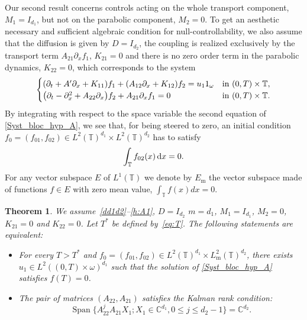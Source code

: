 \documentclass[10pt]{amsart}
\theoremstyle{plain}
\newtheorem{theorem}{Theorem}
\theoremstyle{definition}
\theoremstyle{remark}
\DeclareMathOperator{\Span}{Span}
\newcommand{\diff}[1][-3]{\ensuremath{\mathop{}\mkern#1mu\mathrm{d}}}
\newcommand{\set}{\mathbb}
\renewcommand{\C}{\set{C}}
\newcommand{\T}{\set{T}}
\newcommand{\m}{{\mathrm m}}
\let\originalleft\left
\let\originalright\right
\renewcommand{\left}{\mathopen{}\mathclose\bgroup\originalleft}
\renewcommand{\right}{\aftergroup\egroup\originalright}
\begin{document}
Our second result concerns controls acting on the whole transport component, $M_1=I_{d_1}$, but not on the parabolic component, $M_2=0$.
To get an aesthetic necessary and sufficient algebraic condition for null-controllability, we also assume that the diffusion is given by $D=I_{d_2}$, the coupling is realized exclusively by the transport term $A_{21}\partial_x f_1$, \ie $K_{21}=0$ and there is no zero order term in the parabolic dynamics, \ie $K_{22}=0$, which corresponds to the system
\begin{equation} \label{Syst_bloc_hyp_A}
\begin{cases}
\left(\partial_t +A'\partial_x+K_{11}\right)f_1+\left(A_{12}\partial_x+K_{12}\right)f_2= u_1 1_\omega
&\text{in}\ (0,T)\times \T,\!\\
\left(\partial_t - \partial_x^2+A_{22}\partial_x\right)f_2 + A_{21}\partial_x f_1 = 0 &\text{in}\ (0,T)\times \T.
\end{cases}
\end{equation}
By integrating with respect to the space variable the second equation of \eqref{Syst_bloc_hyp_A}, we see that, for being steered to zero, an initial condition $f_0=(f_{01},f_{02})\in L^2(\T)^{d_1} \times L^2(\T)^{d_2}$ has to satisfy
\begin{equation} \label{Hyp_A_contrainte}
\int_{\T} f_{02}(x) \diff x =0.
\end{equation}
For any vector subspace $E$ of $L^1(\T)$ we denote by $E_\m$ the vector subspace made of functions $f\in E$ with zero mean value, \ie $\int_{\T} f(x)dx =0$.

\begin{theorem}\label{th:main_2}
We assume~\eqref{dd1d2}--\eqref{h:A1}, $D=I_{d_2}$ $m=d_1$, $M_1=I_{d_1}$, $M_2=0$, $K_{21}=0$ and $K_{22}=0$. Let $T^\ast$ be defined by~\eqref{eq:T}.
The following statements are equivalent:
\begin{itemize}
\item For every $T>T^{\ast}$ and $f_0=(f_{01},f_{02})\in L^2(\T)^{d_1} \times L^2_\m(\T)^{d_2}$, there exists $u_1 \in L^2((0,T)\times\omega)^{d_1}$ such that the solution of \eqref{Syst_bloc_hyp_A} satisfies $f(T)=0$.
\item The pair of matrices $(A_{22},A_{21})$ satisfies the Kalman rank condition:
\begin{equation} \label{Kalman_Thm2}
\Span \{ A_{22}^j A_{21} X_1 ; X_1 \in \C^{d_1}, 0 \leq j \leq d_2-1 \} = \C^{d_2}.
\end{equation}
\end{itemize}
\end{theorem}
\end{document}
